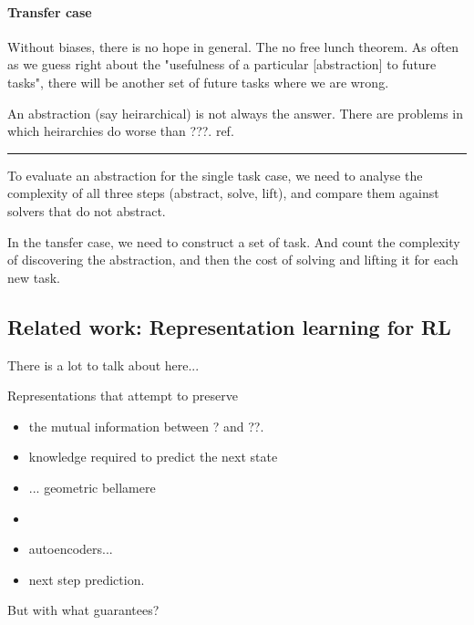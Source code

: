 \paragraph{Transfer case}

Without biases, there is no hope in general. The no free lunch theorem.
As often as we guess right about the "usefulness of a particular [abstraction] to future tasks",
there will be another set of future tasks where we are wrong.

An abstraction (say heirarchical) is not always the answer. There are problems in which
heirarchies do worse than ???. ref.

\begin{center}\rule{0.5\linewidth}{\linethickness}\end{center}

To evaluate an abstraction for the single task case, we need to analyse the
complexity of all three steps (abstract, solve, lift), and compare them against
solvers that do not abstract.

In the tansfer case, we need to construct a set of task. And count the
complexity of discovering the abstraction, and then the cost of solving
and lifting it for each new task.

\subsection{Related work: Representation learning for RL}


{\color{red}There is a lot to talk about here...}

Representations that attempt to preserve
\begin{itemize}
\tightlist
  \item the mutual information between ? and ??.
  \item knowledge required to predict the next state
  \item ... geometric bellamere
  \item \cite{Nachum2018}
  \item autoencoders...
  \item next step prediction.
\end{itemize}

But with what guarantees?
